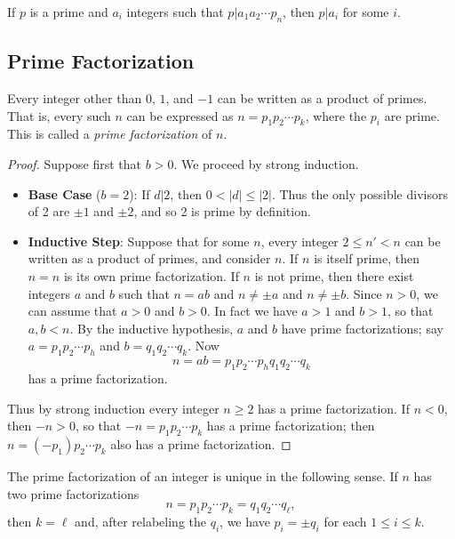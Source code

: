 \documentclass{article}
\begin{document}
\begin{cor}
If $p$ is a prime and $a_i$ integers such that $p|a_1a_2 \cdots p_n$, then $p|a_i$ for some $i$.
\end{cor}



\subsection*{Prime Factorization}

\begin{thm}
Every integer other than $0$, $1$, and $-1$ can be written as a product of primes. That is, every such $n$ can be expressed as $n = p_1p_2 \cdots p_k$, where the $p_i$ are prime. This is called a \emph{prime factorization} of $n$.
\end{thm}

\begin{proof}
Suppose first that $b > 0$. We proceed by strong induction.
\begin{itemize}
\item \textbf{Base Case} ($b = 2$): If $d|2$, then $0 < |d| \leq |2|$. Thus the only possible divisors of 2 are $\pm 1$ and $\pm 2$, and so 2 is prime by definition.
\item \textbf{Inductive Step}: Suppose that for some $n$, every integer $2 \leq n' < n$ can be written as a product of primes, and consider $n$. If $n$ is itself prime, then $n = n$ is its own prime factorization. If $n$ is not prime, then there exist integers $a$ and $b$ such that $n = ab$ and $n \neq \pm a$ and $n \neq \pm b$. Since $n > 0$, we can assume that $a > 0$ and $b > 0$. In fact we have $a > 1$ and $b > 1$, so that $a,b < n$. By the inductive hypothesis, $a$ and $b$ have prime factorizations; say $a = p_1p_2 \cdots p_h$ and $b = q_1q_2 \cdots q_k$. Now \[ n = ab = p_1p_2 \cdots p_h q_1q_2 \cdots q_k \] has a prime factorization.
\end{itemize}
Thus by strong induction every integer $n \geq 2$ has a prime factorization. If $n < 0$, then $-n > 0$, so that $-n = p_1p_2 \cdots p_k$ has a prime factorization; then $n = (-p_1)p_2 \cdots p_k$ also has a prime factorization.
\end{proof}

\begin{thm}
The prime factorization of an integer is unique in the following sense. If $n$ has two prime factorizations \[ n = p_1p_2 \cdots p_k = q_1q_2 \cdots q_\ell, \] then $k = \ell$ and, after relabeling the $q_i$, we have $p_i = \pm q_i$ for each $1 \leq i \leq k$.
\end{thm}
\end{document}
